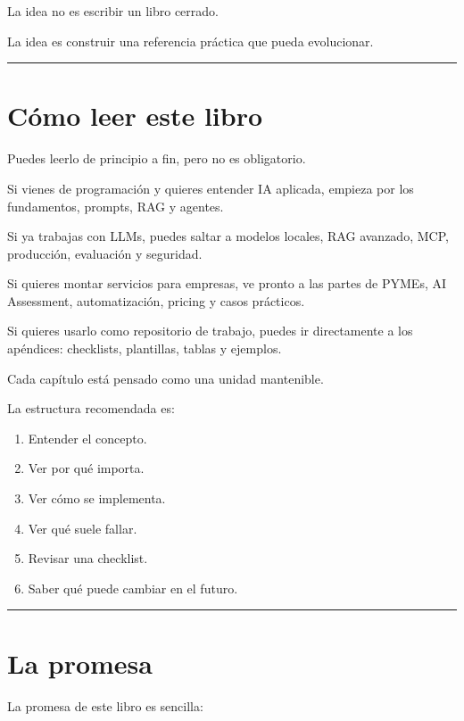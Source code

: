 La idea no es escribir un libro cerrado.

La idea es construir una referencia práctica que pueda evolucionar.

\begin{center}\rule{0.5\linewidth}{0.5pt}\end{center}

\section{Cómo leer este libro}\label{cuxf3mo-leer-este-libro}

Puedes leerlo de principio a fin, pero no es obligatorio.

Si vienes de programación y quieres entender IA aplicada, empieza por
los fundamentos, prompts, RAG y agentes.

Si ya trabajas con LLMs, puedes saltar a modelos locales, RAG avanzado,
MCP, producción, evaluación y seguridad.

Si quieres montar servicios para empresas, ve pronto a las partes de
PYMEs, AI Assessment, automatización, pricing y casos prácticos.

Si quieres usarlo como repositorio de trabajo, puedes ir directamente a
los apéndices: checklists, plantillas, tablas y ejemplos.

Cada capítulo está pensado como una unidad mantenible.

La estructura recomendada es:

\begin{enumerate}
\def\labelenumi{\arabic{enumi}.}
\tightlist
\item
  Entender el concepto.
\item
  Ver por qué importa.
\item
  Ver cómo se implementa.
\item
  Ver qué suele fallar.
\item
  Revisar una checklist.
\item
  Saber qué puede cambiar en el futuro.
\end{enumerate}

\begin{center}\rule{0.5\linewidth}{0.5pt}\end{center}

\section{La promesa}\label{la-promesa}

La promesa de este libro es sencilla:

